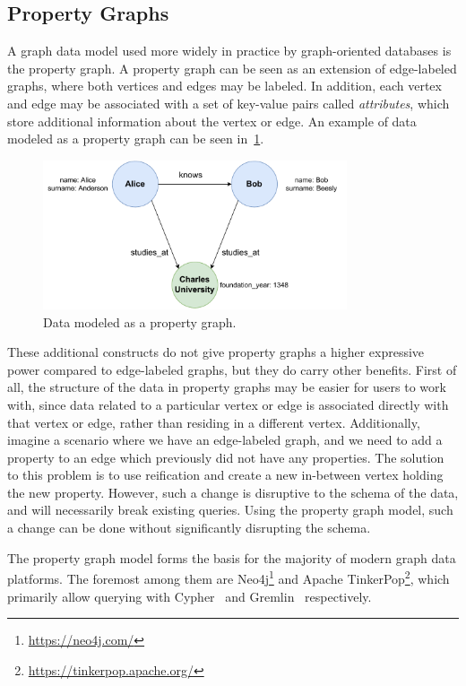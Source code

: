 \subsection{Property Graphs}

A graph data model used more widely in practice by graph-oriented databases is the property graph.
A property graph can be seen as an extension of edge-labeled graphs, where both vertices and edges may be labeled.
In addition, each vertex and edge may be associated with a set of key-value pairs called \textit{attributes}, which store additional information about the vertex or edge.
An example of data modeled as a property graph can be seen in~\cref{fig:propgraph}.

\begin{figure}[ht]
\centerline{\mbox{\includegraphics[width=0.8\textwidth]{img/property-graph.pdf}}}
\caption{Data modeled as a property graph.}
\label{fig:propgraph}
\end{figure}

These additional constructs do not give property graphs a higher expressive power compared to edge-labeled graphs, but they do carry other benefits.
First of all, the structure of the data in property graphs may be easier for users to work with, since data related to a particular vertex or edge is associated directly with that vertex or edge, rather than residing in a different vertex.
Additionally, imagine a scenario where we have an edge-labeled graph, and we need to add a property to an edge which previously did not have any properties.
The solution to this problem is to use reification and create a new in-between vertex holding the new property.
However, such a change is disruptive to the schema of the data, and will necessarily break existing queries.
Using the property graph model, such a change can be done without significantly disrupting the schema.

The property graph  model forms the basis for the majority of modern graph data platforms.
The foremost among them are Neo4j\footnote{\url{https://neo4j.com/}} and Apache TinkerPop\footnote{\url{https://tinkerpop.apache.org/}}, which primarily allow querying with Cypher~\cite{opencypher} and Gremlin~\cite{gremlin} respectively.

